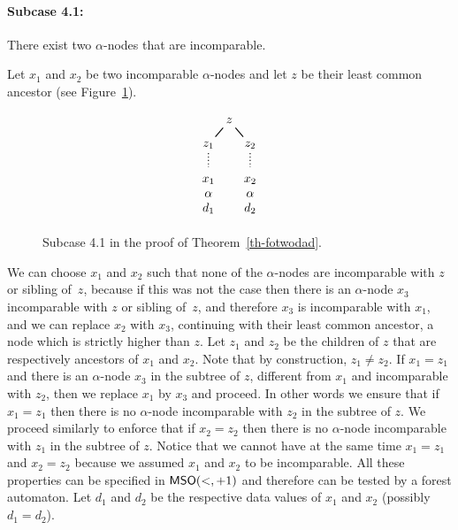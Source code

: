 \documentclass{CSML}
\begin{document}
\paragraph{\bf Subcase 4.1:} There exist two $\alpha$-nodes that are incomparable. 

Let $x_1$ and $x_2$ be two incomparable $\alpha$-nodes and let $z$ 
be their least common ancestor
(see Figure~\ref{fig:case41a}).
\begin{figure}
\[
\begin{tikzpicture} [-,thick]
\tikzstyle{level 1}=[level distance=7mm,sibling distance=12mm]
\tikzstyle{level 2}=[level distance=14mm,sibling distance=5mm]
\node {$z$}
  child { node {$z_1$} 
child[dotted] { node {$\begin{array}{c} x_1\\ \alpha\\ d_1 \end{array}$} } } 
  child { node {$z_2$} 
	  child[dotted] { node {$\begin{array}{c} x_2\\ \alpha\\ d_2 \end{array}$} } }; 
\end{tikzpicture}
\]
\caption{Subcase 4.1 in the proof of Theorem~\ref{th-fotwodad}.}
\label{fig:case41a}
\end{figure}
 We can choose $x_1$ and $x_2$ such that none of the
$\alpha$-nodes are incomparable with $z$ or sibling of~$z$, because if this was not
the case then there is an $\alpha$-node $x_3$ incomparable with $z$ or sibling of~$z$, 
and therefore $x_3$ is incomparable with $x_1$, and we can replace $x_2$ with
$x_3$, continuing with their least common ancestor, 
a node which is strictly higher than $z$. 
Let $z_1$ and $z_2$ be the children of $z$ 
that are respectively ancestors of $x_1$ and $x_2$. 
Note that by construction, $z_1\neq z_2$. 
If $x_1=z_1$ and there is an $\alpha$-node $x_3$ in the subtree of $z$, 
different from $x_1$ and incomparable with $z_2$, 
then we replace $x_1$ by $x_3$ and proceed. 
In other words we ensure that if $x_1 = z_1$ 
then there is no $\alpha$-node incomparable with $z_2$ in the subtree of $z$. 
We proceed similarly
to enforce that if $x_2=z_2$ then there is no
$\alpha$-node incomparable with $z_1$ in the subtree of $z$. 
Notice that we cannot have at the same time $x_1 = z_1$ and $x_2 = z_2$
because we assumed $x_1$ and $x_2$ to be incomparable. 
All these properties can be specified in $\mathsf{MSO}(<,+1)$ and therefore can be tested 
by a forest automaton.  
Let $d_1$ and $d_2$ be the respective data values of $x_1$ and $x_2$ (possibly $d_1=d_2$).
\end{document}

